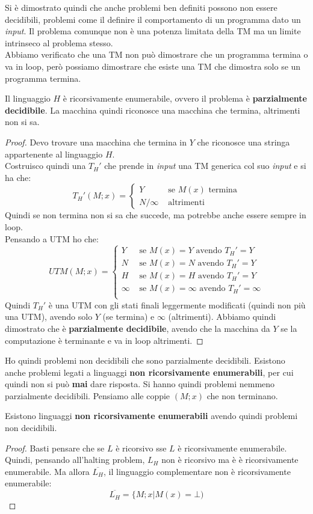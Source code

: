 Si è dimostrato quindi che anche problemi ben definiti possono non essere
decidibili, problemi come il definire il comportamento di un programma dato un
\textit{input}. Il problema comunque non è una potenza limitata della TM ma un limite
intrinseco al problema stesso. \\ Abbiamo verificato che una TM non può dimostrare che un programma termina o va in loop, però possiamo dimostrare che esiste una TM che dimostra solo se un programma termina.
\begin{definizione}
  Il linguaggio $H$ è ricorsivamente enumerabile, ovvero il problema è
  \textbf{parzialmente decidibile}. La macchina quindi riconosce una macchina
  che termina, altrimenti non si sa.  
\end{definizione}
\begin{proof}
  Devo trovare una macchina che termina in $Y$ che riconosce una stringa
  appartenente al linguaggio $H$.\\
  Costruisco quindi una $T_H'$ che prende in \textit{input} una TM generica col suo
  \textit{input} e si ha che:
  \[T_H'(M;x)=
   \begin{cases}
     Y &\mbox{ se } M(x)\mbox{ termina}\\
     N/\infty &\mbox{ altrimenti}
    \end{cases}
  \]
  Quindi se non termina non si sa che succede, ma potrebbe anche essere sempre
  in loop.\\
  Pensando a UTM ho che:
  \[UTM(M;x)=
   \begin{cases}
     Y &\mbox{ se } M(x)=Y\mbox{ avendo }T_H'=Y\\
     N &\mbox{ se } M(x)=N\mbox{ avendo }T_H'=Y\\
     H &\mbox{ se } M(x)=H\mbox{ avendo }T_H'=Y\\
     \infty &\mbox{ se } M(x)=\infty\mbox{ avendo }T_H'=\infty\\
    \end{cases}
  \]
  Quindi $T_H'$ è una UTM con gli stati finali leggermente modificati (quindi
  non più una UTM), avendo
  solo $Y$ (se termina) e $\infty$ (altrimenti). Abbiamo quindi dimostrato che è
  \textbf{parzialmente decidibile}, avendo che la macchina da $Y$ se la
  computazione è terminante e va in loop altrimenti.
\end{proof}
Ho quindi problemi non decidibili che sono parzialmente decidibili. Esistono
anche problemi legati a linguaggi \textbf{non ricorsivamente enumerabili}, per
cui quindi non si può \textbf{mai} dare risposta. Si hanno quindi problemi
nemmeno parzialmente decidibili. Pensiamo alle coppie $(M;x)$ che non terminano.
\begin{definizione}
   Esistono linguaggi \textbf{non ricorsivamente enumerabili} avendo quindi
   problemi non decidibili.
\end{definizione}
\begin{proof}
  Basti pensare che se $L$ è ricorsivo sse $L$ è ricorsivamente
  enumerabile. Quindi, pensando all'halting problem, $L_H$ non è ricorsivo ma è
  è ricorsivamente enumerabile. Ma allora $\overline{L_H}$, il linguaggio
  complementare non è ricorsivamente enumerabile: 
  \[\overline{L_H}=\{M;x|M(x)=\bot)\]
\end{proof}
